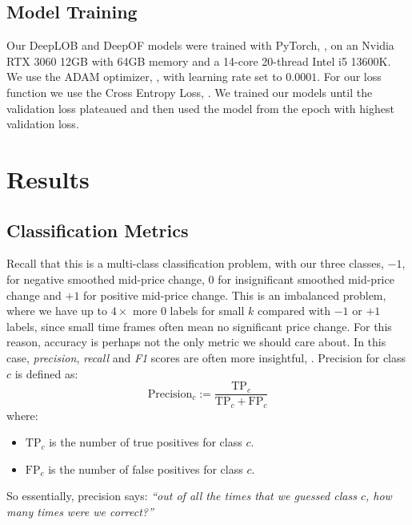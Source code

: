 \subsection{Model Training}
Our DeepLOB and DeepOF models were trained with PyTorch, \cite{PYTORCH2017},
on an Nvidia RTX 3060 12GB with 64GB memory and a 14-core 20-thread Intel i5 13600K.
We use the ADAM optimizer, \cite{ADAM2017}, with learning rate set to $0.0001$.
For our loss function we use the Cross Entropy Loss, \cite{CROSSENTROPYLOSS}.
We trained our models until the validation loss plateaued and then used
the model from the epoch with highest validation loss.
\clearpage

\section{Results}

\subsection{Classification Metrics}

Recall that this is a multi-class classification problem, with our three classes,
$-1$, for negative smoothed mid-price change, $0$ for insignificant smoothed mid-price change and $+1$ for positive mid-price change. 
This is an imbalanced problem, where we have up to $4 \times$ more $0$ labels for small $k$ compared with
$-1$ or $+1$ labels, since small time frames often mean no significant price change.
For this reason, accuracy is perhaps not the only metric we should care about.
In this case, \textit{precision}, \textit{recall} and \textit{F1} scores are often more insightful, \cite{HASTIE2001}.
Precision for class $ c $ is defined as:
\begin{equation}
\text{Precision}_c := \frac{\text{TP}_c}{\text{TP}_c + \text{FP}_c}
\end{equation}
where:
\begin{itemize}
    \item $ \text{TP}_c $ is the number of true positives for class $c$.
    \item $ \text{FP}_c $ is the number of false positives for class $c$.
\end{itemize}
So essentially, precision says: \textit{``out of all the times that we guessed class $c$, how many times were we correct?''}

